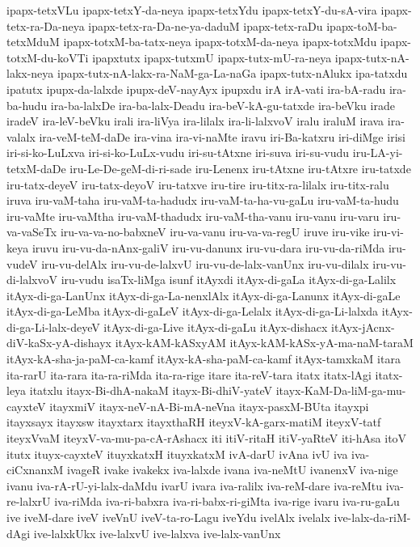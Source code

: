 {ipapx-tetxVLu
ipapx-tetxY-da-neya
ipapx-tetxYdu
ipapx-tetxY-du-sA-vira
ipapx-tetx-ra-Da-neya
ipapx-tetx-ra-Da-ne-ya-daduM
ipapx-tetx-raDu
ipapx-toM-ba-tetxMduM
ipapx-totxM-ba-tatx-neya
ipapx-totxM-da-neya
ipapx-totxMdu
ipapx-totxM-du-koVTi
ipapxtutx
ipapx-tutxmU
ipapx-tutx-mU-ra-neya
ipapx-tutx-nA-lakx-neya
ipapx-tutx-nA-lakx-ra-NaM-ga-La-naGa
ipapx-tutx-nAlukx
ipa-tatxdu
ipatutx
ipupx-da-lalxde
ipupx-deV-nayAyx
ipupxdu
irA
irA-vati
ira-bA-radu
ira-ba-hudu
ira-ba-lalxDe
ira-ba-lalx-Deadu
ira-beV-kA-gu-tatxde
ira-beVku
irade
iradeV
ira-leV-beVku
irali
ira-liVya
ira-lilalx
ira-li-lalxvoV
iralu
iraluM
irava
ira-valalx
ira-veM-teM-daDe
ira-vina
ira-vi-naMte
iravu
iri-Ba-katxru
iri-diMge
irisi
iri-si-ko-LuLxva
iri-si-ko-LuLx-vudu
iri-su-tAtxne
iri-suva
iri-su-vudu
iru-LA-yi-tetxM-daDe
iru-Le-De-geM-di-ri-sade
iru-Lenenx
iru-tAtxne
iru-tAtxre
iru-tatxde
iru-tatx-deyeV
iru-tatx-deyoV
iru-tatxve
iru-tire
iru-titx-ra-lilalx
iru-titx-ralu
iruva
iru-vaM-taha
iru-vaM-ta-hadudx
iru-vaM-ta-ha-vu-gaLu
iru-vaM-ta-hudu
iru-vaMte
iru-vaMtha
iru-vaM-thadudx
iru-vaM-tha-vanu
iru-vanu
iru-varu
iru-va-vaSeTx
iru-va-va-no-babxneV
iru-va-vanu
iru-va-va-regU
iruve
iru-vike
iru-vi-keya
iruvu
iru-vu-da-nAnx-galiV
iru-vu-danunx
iru-vu-dara
iru-vu-da-riMda
iru-vudeV
iru-vu-delAlx
iru-vu-de-lalxvU
iru-vu-de-lalx-vanUnx
iru-vu-dilalx
iru-vu-di-lalxvoV
iru-vudu
isaTx-liMga
isunf
itAyxdi
itAyx-di-gaLa
itAyx-di-ga-Lalilx
itAyx-di-ga-LanUnx
itAyx-di-ga-La-nenxlAlx
itAyx-di-ga-Lanunx
itAyx-di-gaLe
itAyx-di-ga-LeMba
itAyx-di-gaLeV
itAyx-di-ga-Lelalx
itAyx-di-ga-Li-lalxda
itAyx-di-ga-Li-lalx-deyeV
itAyx-di-ga-Live
itAyx-di-gaLu
itAyx-dishacx
itAyx-jAcnx-diV-kaSx-yA-dishayx
itAyx-kAM-kASxyAM
itAyx-kAM-kASx-yA-ma-naM-taraM
itAyx-kA-sha-ja-paM-ca-kamf
itAyx-kA-sha-paM-ca-kamf
itAyx-tamxkaM
itara
ita-rarU
ita-rara
ita-ra-riMda
ita-ra-rige
itare
ita-reV-tara
itatx
itatx-lAgi
itatx-leya
itatxlu
itayx-Bi-dhA-nakaM
itayx-Bi-dhiV-yateV
itayx-KaM-Da-liM-ga-mu-cayxteV
itayxmiV
itayx-neV-nA-Bi-mA-neVna
itayx-pasxM-BUta
itayxpi
itayxsayx
itayxsw
itayxtarx
itayxthaRH
iteyxV-kA-garx-matiM
iteyxV-tatf
iteyxVvaM
iteyxV-va-mu-pa-cA-rAshacx
iti
itiV-ritaH
itiV-yaRteV
iti-hAsa
itoV
itutx
ituyx-cayxteV
ituyxkatxH
ituyxkatxM
ivA-darU
ivAna
ivU
iva
iva-ciCxnanxM
ivageR
ivake
ivakekx
iva-lalxde
ivana
iva-neMtU
ivanenxV
iva-nige
ivanu
iva-rA-rU-yi-lalx-daMdu
ivarU
ivara
iva-ralilx
iva-reM-dare
iva-reMtu
iva-re-lalxrU
iva-riMda
iva-ri-babxra
iva-ri-babx-ri-giMta
iva-rige
ivaru
iva-ru-gaLu
ive
iveM-dare
iveV
iveVnU
iveV-ta-ro-Lagu
iveYdu
ivelAlx
ivelalx
ive-lalx-da-riM-dAgi
ive-lalxkUkx
ive-lalxvU
ive-lalxva
ive-lalx-vanUnx
}
